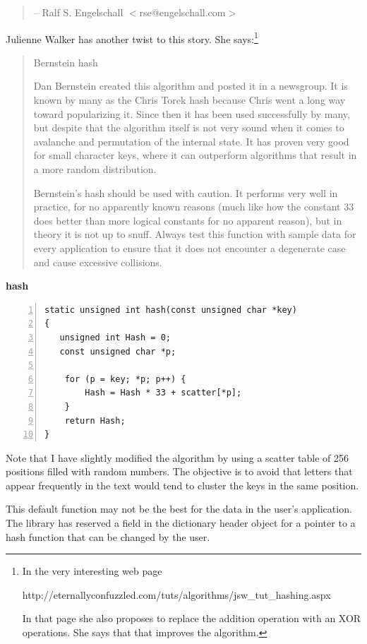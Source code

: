 \documentclass[12pt,a4paper]{memoir} %
\newif\iftth
\newcommand{\container}{}
\newcommand{\function}[1] {%
\vspace{0.2in}
\par\noindent
\textbf{#1}\index{#1!code for \container} \hrulefill
\iftth\else
\nopagebreak
\fi
\noindent\begin{Verbatim}[numbers=left, xleftmargin=7mm]}
\begin{document}
{{\begin{quotation}
{                 -- Ralf S. Engelschall $<$rse@engelschall.com$>$
}                
\end{quotation}
Julienne Walker has another twist to this story. She says:\footnote{In the very interesting web page \par\noindent
http://eternallyconfuzzled.com/tuts/algorithms/jsw\_tut\_hashing.aspx\par\noindent In that page she also proposes to replace the addition operation with an XOR operations. She says that that improves the algorithm.}
\begin{quotation}
Bernstein hash

Dan Bernstein created this algorithm and posted it in a newsgroup. It is known by many as the Chris Torek hash because Chris went a long way toward popularizing it. Since then it has been used successfully by many, but despite that the algorithm itself is not very sound when it comes to avalanche and permutation of the internal state. It has proven very good for small character keys, where it can outperform algorithms that result in a more random distribution.

Bernstein's hash should be used with caution. It performs very well in practice, for no apparently known reasons (much like how the constant 33 does better than more logical constants for no apparent reason), but in theory it is not up to snuff. Always test this function with sample data for every application to ensure that it does not encounter a degenerate case and cause excessive collisions.
\end{quotation}
\function{hash}
static unsigned int hash(const unsigned char *key)
{
   unsigned int Hash = 0;
   const unsigned char *p;
		
    for (p = key; *p; p++) {
        Hash = Hash * 33 + scatter[*p];
    }
    return Hash;
}
\end{Verbatim}
Note that I have slightly modified the algorithm by using a scatter table of 256 positions filled with random numbers. The objective is to avoid
that letters that appear frequently in the text would tend to cluster the keys in  the same position.

This default function may not be the best for the data in the user's application. The library has reserved a field in the dictionary header object for a pointer to a hash function that can be changed by the user.

}}
\end{document}
